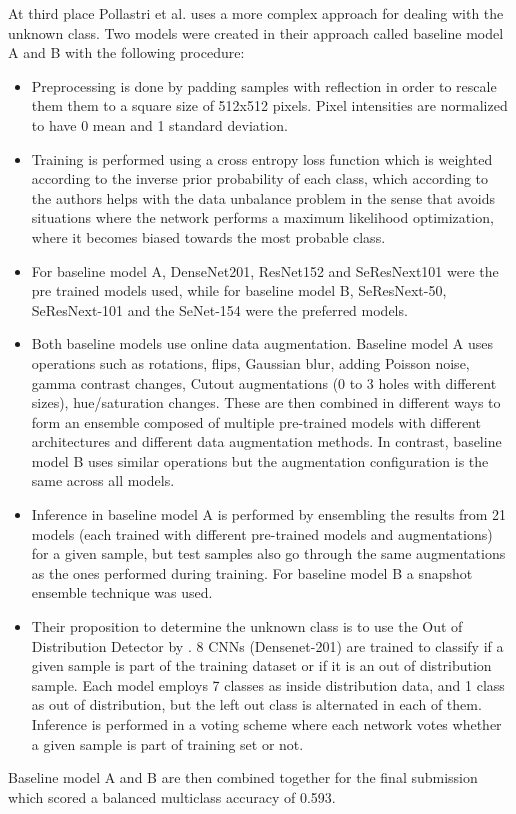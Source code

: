     At third place Pollastri et al. \cite{isic2019third} uses a more complex approach for dealing with the unknown class. Two models were created in their approach called baseline model A and B with the following procedure:
    \begin{itemize}
        \item Preprocessing is done by padding samples with reflection in order to rescale them them to a square size of 512x512 pixels. Pixel intensities are normalized to have 0 mean and 1 standard deviation.
        \item Training is performed using a cross entropy loss function which is weighted according to the inverse prior probability of each class, which according to the authors helps with the data unbalance problem in the sense that avoids situations where the network performs a maximum likelihood optimization, where it becomes biased towards the most probable class. 
        \item For baseline model A, DenseNet201, ResNet152 and SeResNext101 were the pre trained models used, while for baseline model B, SeResNext-50, SeResNext-101 and the SeNet-154 were the preferred models.
        \item Both baseline models use online data augmentation. Baseline model A uses operations such as rotations, flips, Gaussian blur, adding Poisson noise, gamma contrast changes, Cutout augmentations \cite{cutout} (0 to 3 holes with different sizes), hue/saturation changes. These are then combined in different ways to form an ensemble composed of multiple pre-trained models with different architectures and different data augmentation methods. In contrast, baseline model B uses similar operations but the augmentation configuration is the same across all models.
        \item Inference in baseline model A is performed by ensembling the results from 21 models (each trained with different pre-trained models and augmentations) for a given sample, but test samples also go through the same augmentations as the ones performed during training. For baseline model B a snapshot ensemble technique \cite{snapshot} was used. 
        \item Their proposition to determine the unknown class is to use the Out of Distribution Detector by \cite{Vyas2018}. 8 CNNs (Densenet-201) are trained to classify if a given sample is part of the training dataset or if it is an out of distribution sample. Each model employs 7 classes as inside distribution data, and 1 class as out of distribution, but the left out class is alternated in each of them. Inference is performed in a voting scheme where each network votes whether a given sample is part of training set or not.
    \end{itemize}
    Baseline model A and B are then combined together for the final submission which scored a balanced multiclass accuracy of 0.593. \par 
    
